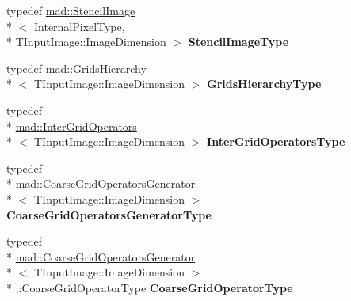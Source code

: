 \begin{DoxyCompactItemize}
\item 
\hypertarget{classitk_1_1_multigrid_anisotropic_diffusion_image_filter_a6bb63b70b7d5b408fe4c6adee053bf73}{typedef \hyperlink{classitk_1_1mad_1_1_stencil_image}{mad\-::\-Stencil\-Image}\\*
$<$ Internal\-Pixel\-Type, \\*
T\-Input\-Image\-::\-Image\-Dimension $>$ {\bfseries Stencil\-Image\-Type}}\label{classitk_1_1_multigrid_anisotropic_diffusion_image_filter_a6bb63b70b7d5b408fe4c6adee053bf73}

\item 
\hypertarget{classitk_1_1_multigrid_anisotropic_diffusion_image_filter_a32c49de5ba3cae3731c4b973839a49a4}{typedef \hyperlink{classitk_1_1mad_1_1_grids_hierarchy}{mad\-::\-Grids\-Hierarchy}\\*
$<$ T\-Input\-Image\-::\-Image\-Dimension $>$ {\bfseries Grids\-Hierarchy\-Type}}\label{classitk_1_1_multigrid_anisotropic_diffusion_image_filter_a32c49de5ba3cae3731c4b973839a49a4}

\item 
\hypertarget{classitk_1_1_multigrid_anisotropic_diffusion_image_filter_ac2321112a8bd8744172c4762afecab3c}{typedef \\*
\hyperlink{classitk_1_1mad_1_1_inter_grid_operators}{mad\-::\-Inter\-Grid\-Operators}\\*
$<$ T\-Input\-Image\-::\-Image\-Dimension $>$ {\bfseries Inter\-Grid\-Operators\-Type}}\label{classitk_1_1_multigrid_anisotropic_diffusion_image_filter_ac2321112a8bd8744172c4762afecab3c}

\item 
\hypertarget{classitk_1_1_multigrid_anisotropic_diffusion_image_filter_a92e843466625b157020146038918e46c}{typedef \\*
\hyperlink{classitk_1_1mad_1_1_coarse_grid_operators_generator}{mad\-::\-Coarse\-Grid\-Operators\-Generator}\\*
$<$ T\-Input\-Image\-::\-Image\-Dimension $>$ {\bfseries Coarse\-Grid\-Operators\-Generator\-Type}}\label{classitk_1_1_multigrid_anisotropic_diffusion_image_filter_a92e843466625b157020146038918e46c}

\item 
\hypertarget{classitk_1_1_multigrid_anisotropic_diffusion_image_filter_a215b1578facc40704aa17ea36ee2eafa}{typedef \\*
\hyperlink{classitk_1_1mad_1_1_coarse_grid_operators_generator}{mad\-::\-Coarse\-Grid\-Operators\-Generator}\\*
$<$ T\-Input\-Image\-::\-Image\-Dimension $>$\\*
\-::Coarse\-Grid\-Operator\-Type {\bfseries Coarse\-Grid\-Operator\-Type}}\label{classitk_1_1_multigrid_anisotropic_diffusion_image_filter_a215b1578facc40704aa17ea36ee2eafa}


\end{DoxyCompactItemize}
